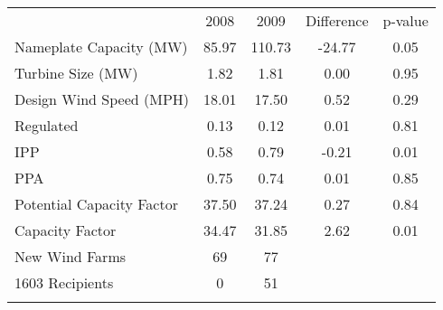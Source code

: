 \begin{center}
\begin{tabular}{lcccc}
\hline \noalign{\smallskip} & 2008 & 2009 & Difference & p-value\\
\noalign{\smallskip}\hline Nameplate Capacity (MW) & 85.97 & 110.73 & -24.77 & 0.05\\
Turbine Size (MW) & 1.82 & 1.81 & 0.00 & 0.95\\
Design Wind Speed (MPH) & 18.01 & 17.50 & 0.52 & 0.29\\
Regulated & 0.13 & 0.12 & 0.01 & 0.81\\
IPP & 0.58 & 0.79 & -0.21 & 0.01\\
PPA & 0.75 & 0.74 & 0.01 & 0.85\\
Potential Capacity Factor & 37.50 & 37.24 & 0.27 & 0.84\\
Capacity Factor & 34.47 & 31.85 & 2.62 & 0.01\\
\hline \noalign{\smallskip}New Wind Farms & 69 & 77 &  & \\
1603 Recipients  & 0 & 51 &  & \\
\noalign{\smallskip}\hline\end{tabular}\\
\end{center}
